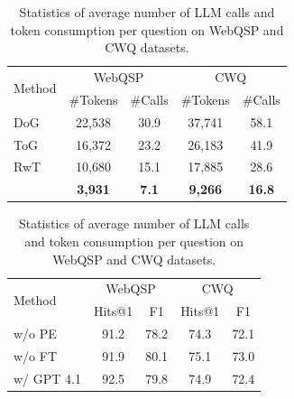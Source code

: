 \begin{table}[t]
\centering
\begin{minipage}{\textwidth}
\begin{minipage}[t]{0.47\textwidth}
\makeatletter{}
\centering
\footnotesize
\tabcolsep=3pt
\begin{tabular}{l@{\hspace{2em}}|cc|cc}
\toprule
\multirow{2}{*}{Method} & \multicolumn{2}{c|}{WebQSP} & \multicolumn{2}{c}{CWQ} \\
 & \#Tokens & \#Calls & \#Tokens & \#Calls \\
\midrule
DoG       & 22,538 & 30.9  & 37,741 & 58.1 \\
ToG       & 16,372 &  23.2 & 26,183 & 41.9 \\
RwT       & 10,680 & 15.1 & 17,885 &  28.6 \\
\midrule
\method{} &  \textbf{3,931} & \textbf{7.1} &  \textbf{9,266} &  \textbf{16.8} \\
\bottomrule
\end{tabular}
\vspace{0.5cm}
\caption{Statistics of average number of LLM calls and token consumption per question on WebQSP and CWQ datasets.}
\label{tab:Efficiency}
\end{minipage}
\hspace{0.18in}
\begin{minipage}[t]{0.48\textwidth}
\makeatletter{}
\centering
\footnotesize
\tabcolsep=3pt
\begin{tabular}{l|cc|cc}
\toprule
\multirow{2}{*}{Method} & \multicolumn{2}{c}{WebQSP} & \multicolumn{2}{c}{CWQ} \\
 & Hits@1 & F1 & Hits@1 & F1 \\
\midrule

\method{} w/o PE & 91.2 & 78.2 & 74.3 & 72.1 \\

\method{} w/o FT & 91.9 & 80.1 & 75.1 & 73.0 \\

\method{} w/ GPT 4.1 & 92.5 & 79.8 & 74.9 & 72.4 \\





\end{tabular}
\end{minipage}
\end{minipage}
\end{table}
